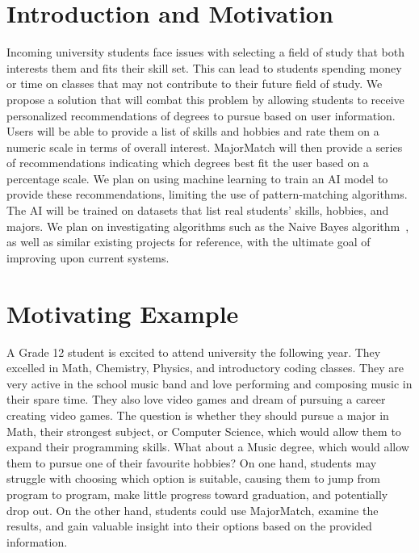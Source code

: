 \documentclass[sigconf]{acmart}
\begin{document}


\section{Introduction and Motivation}

Incoming university students face issues with selecting a field of study that both interests them and fits their skill set. This can lead to students spending money or time on classes that may not contribute to their future field of study. We propose a solution that will combat this problem by allowing students to receive personalized recommendations of degrees to pursue based on user information. Users will be able to provide a list of skills and hobbies and rate them on a numeric scale in terms of overall interest. MajorMatch will then provide a series of recommendations indicating which degrees best fit the user based on a percentage scale. We plan on using machine learning to train an AI model to provide these recommendations, limiting the use of pattern-matching algorithms. The AI will be trained on datasets that list real students' skills, hobbies, and majors. We plan on investigating algorithms such as the Naive Bayes algorithm~\cite{ahvar}, as well as similar existing projects for reference, with the ultimate goal of improving upon current systems.


\section{Motivating Example}

A Grade 12 student is excited to attend university the following year. They excelled in Math, Chemistry, Physics, and introductory coding classes. They are very active in the school music band and love performing and composing music in their spare time. They also love video games and dream of pursuing a career creating video games. The question is whether they should pursue a major in Math, their strongest subject, or Computer Science, which would allow them to expand their programming skills. What about a Music degree, which would allow them to pursue one of their favourite hobbies? On one hand, students may struggle with choosing which option is suitable, causing them to jump from program to program, make little progress toward graduation, and potentially drop out. On the other hand, students could use MajorMatch, examine the results, and gain valuable insight into their options based on the provided information.
\end{document}
